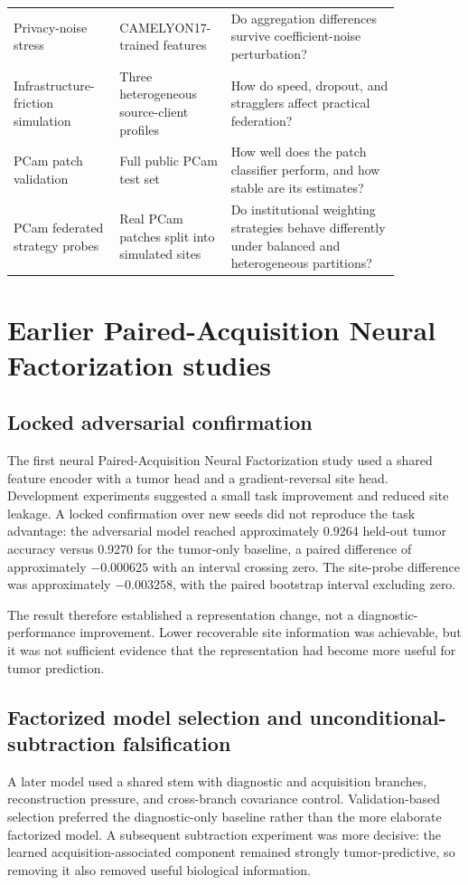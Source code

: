 \begin{table}[!htbp]
\begin{tabular}{p{0.25\linewidth}p{0.20\linewidth}p{0.40\linewidth}}
Privacy-noise stress & CAMELYON17-trained features & Do aggregation differences survive coefficient-noise perturbation? \\
Infrastructure-friction simulation & Three heterogeneous source-client profiles & How do speed, dropout, and stragglers affect practical federation? \\
PCam patch validation & Full public PCam test set & How well does the patch classifier perform, and how stable are its estimates? \\
PCam federated strategy probes & Real PCam patches split into simulated sites & Do institutional weighting strategies behave differently under balanced and heterogeneous partitions? \\
\bottomrule
\end{tabular}
\label{tab:study_map}
\end{table}
\FloatBarrier

\section{Earlier Paired-Acquisition Neural Factorization studies}

\subsection{Locked adversarial confirmation}
The first neural Paired-Acquisition Neural Factorization study used a shared feature encoder with a tumor head and a gradient-reversal site head. Development experiments suggested a small task improvement and reduced site leakage. A locked confirmation over new seeds did not reproduce the task advantage: the adversarial model reached approximately 0.9264 held-out tumor accuracy versus 0.9270 for the tumor-only baseline, a paired difference of approximately $-0.000625$ with an interval crossing zero. The site-probe difference was approximately $-0.003258$, with the paired bootstrap interval excluding zero.

The result therefore established a representation change, not a diagnostic-performance improvement. Lower recoverable site information was achievable, but it was not sufficient evidence that the representation had become more useful for tumor prediction.

\subsection{Factorized model selection and unconditional-subtraction falsification}
A later model used a shared stem with diagnostic and acquisition branches, reconstruction pressure, and cross-branch covariance control. Validation-based selection preferred the diagnostic-only baseline rather than the more elaborate factorized model. A subsequent subtraction experiment was more decisive: the learned acquisition-associated component remained strongly tumor-predictive, so removing it also removed useful biological information.

